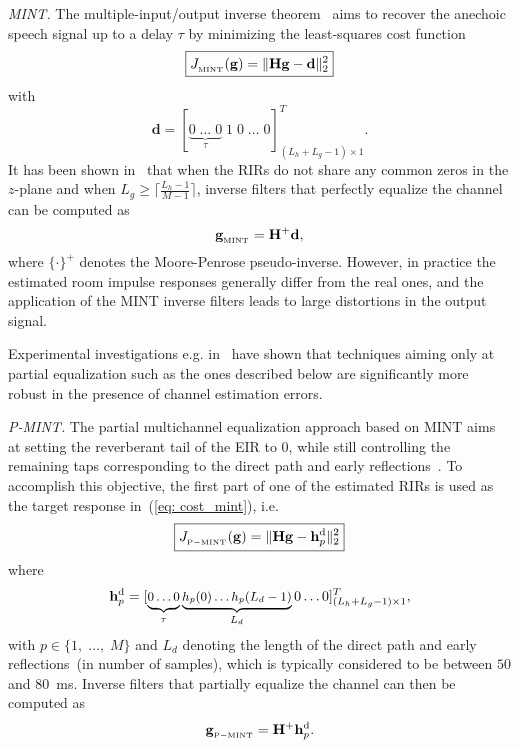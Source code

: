 \documentclass{article}
\begin{document}
\smallskip \noindent \textit{MINT.} \enspace The multiple-input/output inverse theorem~\cite{Miyoshi_ITASS_1988} aims to recover the anechoic speech signal up to a delay $\tau$ by minimizing the least-squares cost function
\begin{equation}
\label{eq: cost_mint}
\boxed{J_{{}_{\rm MINT}}(\mathbf{g}) = \|\mathbf{H}\mathbf{g} - \mathbf{d}\|_2^2}
\end{equation}
with
\begin{equation}
  \mathbf{d} = [\underbrace{0 \; \ldots \; 0}_{\tau} \; 1 \; 0 \; \ldots \; 0 ]_{(L_h+L_g-1) \times 1}^T.
\end{equation}
It has been shown in~\cite{Miyoshi_ITASS_1988} that when the RIRs do not share any common zeros in the $z$-plane and when $L_g \geq \lceil{\frac{L_h-1}{M-1}\rceil}$, inverse filters that perfectly equalize the channel can be computed as
\begin{equation}
  \mathbf{g}_{{}_{\rm MINT}} = \mathbf{H}^+\mathbf{d},
\end{equation}
where $\{\cdot\}^+$ denotes the Moore-Penrose pseudo-inverse. 
However, in practice the estimated room impulse responses generally differ from the real ones, and the application of the MINT inverse filters leads to large distortions in the output signal.

Experimental investigations e.g. in~\cite{Zhang_IWAENC_2010,Kodrasi_ICASSP_2012} have shown that techniques aiming only at partial equalization such as the ones described below are significantly more robust in the presence of channel estimation errors.

\smallskip \noindent \textit{P-MINT.} \enspace The partial multichannel equalization approach based on MINT aims at setting the reverberant tail of the EIR to $0$, while still controlling the remaining taps corresponding to the direct path and early reflections~\cite{Kodrasi_ICASSP_2012}. 
To accomplish this objective, the first part of one of the estimated RIRs is used as the target response in~(\ref{eq: cost_mint}), i.e.  
\begin{equation}
\boxed{J_{{}_{\rm P-MINT}}(\mathbf{g}) = \|{\mathbf{H}}\mathbf{g} - {\mathbf{h}}_p^{\rm d}\|_2^2}
\end{equation}
where
\begin{equation}
\small
\mathbf{h}_{p}^{\rm d} = [\underbrace{0\phantom{\rlap{$(L_d-1)$}} \ldots 0 }_{\tau} \underbrace{h_p(0) \ldots h_p(L_d-1)}_{L_d} 0 \ldots 0 ]_{(L_h+L_g-1) \times 1}^{T},
\end{equation}
with $p \in \{1, \; \ldots, \; M\}$ and $L_d$ denoting the length of the direct path and early reflections~(in number of samples), which is typically considered to be between $50$ and $80$~ms.
Inverse filters that partially equalize the channel can then be computed as
\begin{equation}  
\label{eq: Pmintsol}  
\mathbf{g}_{{}_{\rm P-MINT}} = {\mathbf{H}}^{+}{\mathbf{h}}_p^{\rm d}.
\end{equation}  
\end{document}
